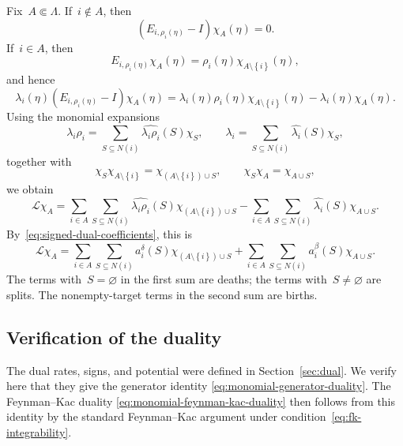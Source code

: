 \documentclass[EJP,preprint,NODS,nobera]{ejpecp}
\newcommand{\bb}[1]{\left(#1\right)}
\newcommand{\cb}[1]{\left\{#1\right\}}
\newcommand{\Lcal}{\mathcal{L}}
\begin{document}
Fix~$A\Subset\Lambda$. If~$i\notin A$, then
\begin{equation*}
\bb{E_{i,\rho_i(\eta)}-I}\chi_A(\eta)=0.
\end{equation*}
If~$i\in A$, then
\begin{equation*}
E_{i,\rho_i(\eta)}\chi_A(\eta)
=
\rho_i(\eta)\chi_{A\setminus\cb{i}}(\eta),
\end{equation*}
and hence
\begin{equation*}
\lambda_i(\eta)\bb{E_{i,\rho_i(\eta)}-I}\chi_A(\eta)
=
\lambda_i(\eta)\rho_i(\eta)\chi_{A\setminus\cb{i}}(\eta)
-
\lambda_i(\eta)\chi_A(\eta).
\end{equation*}
Using the monomial expansions
\begin{equation*}
\lambda_i\rho_i
=
\sum_{S\subseteq N(i)}\widehat{\lambda_i\rho_i}(S)\chi_S,
\qquad
\lambda_i
=
\sum_{S\subseteq N(i)}\widehat{\lambda_i}(S)\chi_S,
\end{equation*}
together with
\begin{equation*}
\chi_S\chi_{A\setminus\cb{i}}
=
\chi_{\bb{A\setminus\cb{i}}\cup S},
\qquad
\chi_S\chi_A=\chi_{A\cup S},
\end{equation*}
we obtain
\begin{equation*}
\Lcal\chi_A
=
\sum_{i\in A}\sum_{S\subseteq N(i)}
\widehat{\lambda_i\rho_i}(S)
\chi_{\bb{A\setminus\cb{i}}\cup S}-
\sum_{i\in A}\sum_{S\subseteq N(i)}
\widehat{\lambda_i}(S)\chi_{A\cup S}.
\end{equation*}
By~\eqref{eq:signed-dual-coefficients}, this is
\begin{equation}
\label{eq:generator-action-monomials}
\Lcal\chi_A
=
\sum_{i\in A}\sum_{S\subseteq N(i)}
a_i^\delta(S)\chi_{\bb{A\setminus\cb{i}}\cup S}
+
\sum_{i\in A}\sum_{S\subseteq N(i)}
a_i^\beta(S)\chi_{A\cup S}.
\end{equation}
The terms with~$S=\varnothing$ in the first sum are deaths; the terms
with~$S\neq\varnothing$ are splits. The nonempty-target terms in the second sum
are births.

\subsection{Verification of the duality}
\label{app:dual-data}

The dual rates, signs, and potential were defined in
Section~\ref{sec:dual}. We verify here that they give the generator identity
\eqref{eq:monomial-generator-duality}. The Feynman--Kac duality
\eqref{eq:monomial-feynman-kac-duality} then follows from this identity by the
standard Feynman--Kac argument under condition~\eqref{eq:fk-integrability}.
\end{document}
